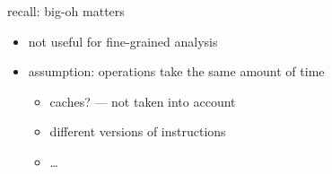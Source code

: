 \begin{frame}{recall: big-oh matters}
    \begin{itemize}
    \item not useful for fine-grained analysis
    \item assumption: operations take the same amount of time
        \begin{itemize}
        \item caches? --- not taken into account
        \item different versions of instructions
        \item \ldots
        \end{itemize}
    \end{itemize}
\end{frame}
